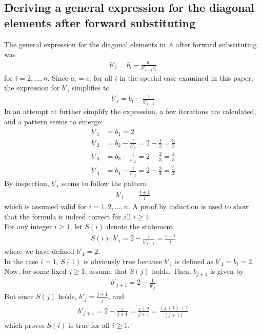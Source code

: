 \documentclass[aps,prl,reprint,toc]{revtex4-1}
\begin{document}
\subsection{Deriving a general expression for the diagonal elements after forward substituting}
The general expression for the diagonal elements in $A$ after forward substituting was
\begin{align*}
  b'_i = b_i - \frac{a_i}{b'_{i-1} c_i}
\end{align*}
for $i = 2, \hdots, n$. Since $a_i = c_i$ for all $i$ in the special case examined in this paper,
 the expression for $b'_i$ simplifies to
\begin{align*}
  b'_i = b_i - \frac{1}{b'_{i-1}}
\end{align*}
In an attempt at further simplify the expression, a few iterations are calculated, and
a pattern seems to emerge:
\begin{align*}
  b'_1 &= b_1 = 2\\
  b'_2 &= b_2 - \frac{1}{b'_1} = 2 - \frac{1}{2} = \frac{3}{2}\\
  b'_3 &= b_3 - \frac{1}{b'_2} = 2 - \frac{2}{3} = \frac{4}{3}\\
  b'_4 &= b_4 - \frac{1}{b'_3} = 2 - \frac{3}{4} = \frac{5}{4}
\end{align*}
By inspection, $b'_i$ seems to follow the pattern
\begin{align*}
  b'_i &= \frac{i+1}{i}
\end{align*}
which is assumed valid for $i = 1,2,\hdots,n$. A proof by induction is used to
show that the formula is indeed correct for all $i \geq 1$.
\\[12pt]
For any integer $i \geq 1$, let $S(i)$ denote the statement
\begin{align*}
  S(i): b'_i = 2 - \frac{1}{b'_{i-1}} = \frac{i+1}{i}
\end{align*}
where we have defined $b'_{1} = 2$.
\\[12pt]
In the case $i = 1$, $S(1)$ is obviously true because $b'_1$ is defined as $b'_1 = b_i = 2$.
Now, for some fixed $j \geq 1$, assume that $S(j)$ holds. Then, $b_{j+1}$ is given by
\begin{align*}
  b'_{j+1} = 2 - \frac{1}{b'_j}
\end{align*}
But since $S(j)$ holds, $b'_j = \frac{j+1}{j}$, and
\begin{align*}
  b'_{j+1} = 2 - \frac{j}{j+1} = \frac{j+2}{j+1} = \frac{(j+1) + 1}{(j+1)}
\end{align*}
which proves $S(i)$ is true for all $i \geq 1$.
\end{document}
